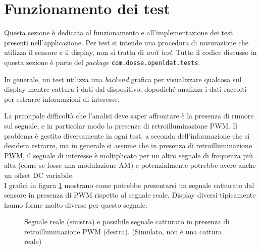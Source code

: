 \section{Funzionamento dei test}
Questa sezione è dedicata al funzionamento e all'implementazione dei test presenti nell'applicazione. Per test si intende una procedura di misurazione che utilizza il sensore e il display, non si tratta di \textit{unit test}. Tutto il codice discusso in questa sezione è parte del \textit{package} \texttt{com.dosse.openldat.tests}.

In generale, un test utilizza una \textit{backend} grafica per visualizzare qualcosa sul display mentre cattura i dati dal dispositivo, dopodiché analizza i dati raccolti per estrarre informazioni di interesse.

La principale difficoltà che l'analisi deve saper affrontare è la presenza di rumore sul segnale, e in particolar modo la presenza di retroilluminazione PWM. Il problema è gestito diversamente in ogni test, a seconda dell'informazione che si desidera estrarre, ma in generale si assume che in presenza di retroilluminazione PWM, il segnale di interesse è moltiplicato per un altro segnale di frequenza più alta (come se fosse una modulazione AM) e potenzialmente potrebbe avere anche un offset DC variabile.\\
I grafici in figura \ref{fig:pwm_example} mostrano come potrebbe presentarsi un segnale catturato dal sensore in presenza di PWM rispetto al segnale reale. Display diversi tipicamente hanno forme molto diverse per questo segnale.
\begin{figure}[H]
	\centering
	\caption{Segnale reale (sinistra) e possibile segnale catturato in presenza di retroilluminazione PWM (destra). (Simulato, non è una cattura reale)}
	\label{fig:pwm_example}
\end{figure}

